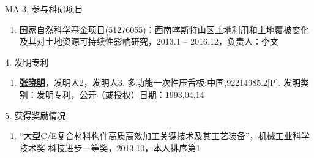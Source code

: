 \begin{achievement}{MA}
3. 参与科研项目
\begin{enumerate}[nosep, label=$\lbrack$\arabic*$\rbrack$]
  \item{国家自然科学基金项目(51276055)：西南喀斯特山区土地利用和土地覆被变化及其对土地资源可持续性影响研究，2013.1 – 2016.12，负责人：李文} %
\end{enumerate}{}\vspace{1em}

4. 发明专利
\begin{enumerate}[nosep, label=$\lbrack$\arabic*$\rbrack$]
  \item{\underline{\bf 张晓明}，发明人2，发明人3. 多功能一次性压舌板:中国,92214985.2[P]. 发明类别：发明专利，公开（或授权）日期：1993,04,14}
\end{enumerate}{}\vspace{1em}

5. 获得奖励情况
\begin{enumerate}[nosep, label=$\lbrack$\arabic*$\rbrack$]
  \item{“大型C/E复合材料构件高质高效加工关键技术及其工艺装备”，机械工业科学技术奖-科技进步一等奖，2013.10，本人排序第1}
\end{enumerate}

\end{achievement}










